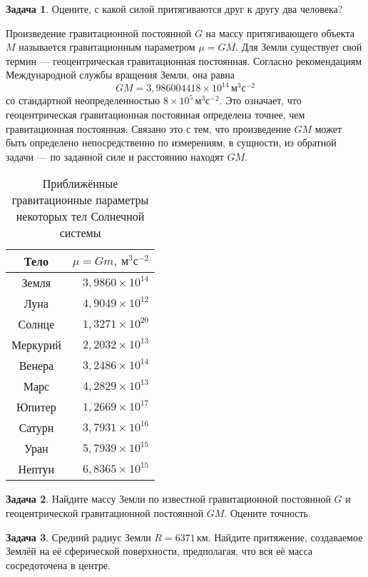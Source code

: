 \documentclass[11pt, a4paper]{article}
\theoremstyle{plain}
\theoremstyle{definition}
\newtheorem{problem}{Задача}[section]
\theoremstyle{remark}
\begin{document}
\begin{problem}
    Оцените, с какой силой притягиваются друг к другу два человека? 
\end{problem}

Произведение гравитационной постоянной $G$ на массу притягивающего объекта $M$ называется
гравитационным параметром $\mu = GM$. Для Земли существует свой термин --- геоцентрическая гравитационная
постоянная. Согласно рекомендациям Международной службы вращения Земли\cite{iers2010}, она равна
\begin{equation*}
    GM = 3,986004418\times10^{14}\,\text{м}^3\text{с}^{-2}
\end{equation*}
со стандартной неопределенностью $8\times10^{5}\,\text{м}^3\text{с}^{-2}$. Это означает, что
геоцентрическая гравитационная постоянная определена точнее, чем гравитационная постоянная. 
Связано это с тем, что произведение $GM$ может быть определено непосредственно по измерениям, 
в сущности, из обратной задачи --- по заданной силе и расстоянию находят $GM$.
\begin{table}[h]
    \centering
    \caption{Приближённые гравитационные параметры некоторых тел Солнечной системы}
    \begin{tabular}{|c|r|}
        \hline
        Тело &$\mu = Gm,\ \text{м}^3\text{с}^{-2}$\\\hline
        Земля &$3,9860\times10^{14}$ \\\hline
        Луна &$4,9049\times10^{12}$ \\\hline
        Солнце &$1,3271\times10^{20}$\\\hline
        Меркурий &$2,2032\times10^{13}$\\\hline
        Венера &$3,2486\times10^{14}$\\\hline
        Марс &$4,2829\times10^{13}$\\\hline
        Юпитер &$1,2669\times10^{17}$\\\hline
        Сатурн &$3,7931\times10^{16}$\\\hline
        Уран &$5,7939\times10^{15}$\\\hline
        Нептун &$6,8365\times10^{15}$\\\hline
    \end{tabular}
    \label{tab:stdgravparam}
\end{table}

\begin{problem}
    Найдите массу Земли по известной гравитационной постоянной $G$ и геоцентрической гравитационной
    постоянной $GM$. Оцените точность.
\end{problem}
\begin{problem}
    Средний радиус Земли $R = 6371\,\text{км}$. Найдите притяжение, создаваемое Землёй
    на её сферической поверхности, предполагая, что вся её масса сосредоточена в центре.
\end{problem}
\end{document}
